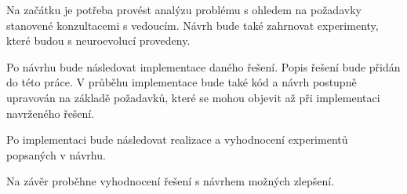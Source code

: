 Na začátku je potřeba provést analýzu problému s ohledem na požadavky stanovené konzultacemi s vedoucím. Návrh bude také zahrnovat experimenty, které budou s neuroevolucí provedeny.

Po návrhu bude následovat implementace daného řešení. Popis řešení bude přidán do této práce. V průběhu implementace bude také kód a návrh postupně upravován na základě požadavků, které se mohou objevit až při implementaci navrženého řešení.

Po implementaci bude následovat realizace a vyhodnocení experimentů popsaných v návrhu.

Na závěr proběhne vyhodnocení řešení s návrhem možných zlepšení.